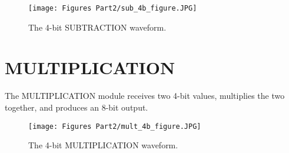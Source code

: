 \documentclass[
	letterpaper, %
	10pt, %
]{CSUniSchoolLabReport}
\begin{document}
\begin{figure}[H] %
	\texttt{[image: Figures Part2/sub\_4b\_figure.JPG]} %
	\caption{The 4-bit SUBTRACTION waveform.}
\end{figure}


\section{MULTIPLICATION}
The MULTIPLICATION module receives two 4-bit values, multiplies the two together, and produces an 8-bit output. 

\begin{figure}[H] %
	\texttt{[image: Figures Part2/mult\_4b\_figure.JPG]} %
	\caption{The 4-bit MULTIPLICATION waveform.}
\end{figure}



\end{document}
